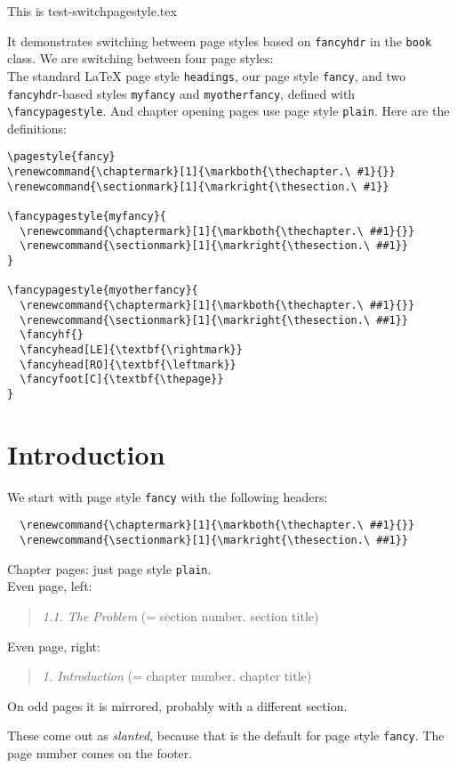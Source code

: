 \documentclass[openany]{book}
\renewcommand{\chaptermark}[1]{\markboth{\thechapter.\ #1}{}}
\renewcommand{\sectionmark}[1]{\markright{\thesection.\ #1}}
\renewcommand{\chaptermark}[1]{\markboth{\thechapter.\ ##1}{}}
\renewcommand{\sectionmark}[1]{\markright{\thesection.\ ##1}}
\renewcommand{\chaptermark}[1]{\markboth{\thechapter.\ ##1}{}}
\renewcommand{\sectionmark}[1]{\markright{\thesection.\ ##1}}
\begin{document}
\tableofcontents

\newpage
\thispagestyle{plain}

\noindent
\begin{boxedminipage}{\textwidth}
  This is test-switchpagestyle.tex

  It demonstrates switching between page styles based on
  \texttt{fancyhdr} in the \texttt{book} class. We are switching between
  four page styles:\\ The standard \LaTeX{} page style \texttt{headings},
  our page style \texttt{fancy}, and two \texttt{fancyhdr}-based styles
  \texttt{myfancy} and \texttt{myotherfancy}, defined with
  \verb|\fancypagestyle|. And chapter opening pages use page style \texttt{plain}.
  Here are the definitions:

\begin{verbatim}
\pagestyle{fancy}
\renewcommand{\chaptermark}[1]{\markboth{\thechapter.\ #1}{}}
\renewcommand{\sectionmark}[1]{\markright{\thesection.\ #1}}

\fancypagestyle{myfancy}{
  \renewcommand{\chaptermark}[1]{\markboth{\thechapter.\ ##1}{}}
  \renewcommand{\sectionmark}[1]{\markright{\thesection.\ ##1}}
}

\fancypagestyle{myotherfancy}{
  \renewcommand{\chaptermark}[1]{\markboth{\thechapter.\ ##1}{}}
  \renewcommand{\sectionmark}[1]{\markright{\thesection.\ ##1}}
  \fancyhf{}
  \fancyhead[LE]{\textbf{\rightmark}}
  \fancyhead[RO]{\textbf{\leftmark}}
  \fancyfoot[C]{\textbf{\thepage}}
}
\end{verbatim}
\end{boxedminipage}

\chapter{Introduction}

\noindent
\begin{boxedminipage}{\textwidth}
We start with page style \texttt{fancy} with the following headers:
\begin{verbatim}
  \renewcommand{\chaptermark}[1]{\markboth{\thechapter.\ ##1}{}}
  \renewcommand{\sectionmark}[1]{\markright{\thesection.\ ##1}}
\end{verbatim}
%
Chapter pages: just page style \texttt{plain}.
\\
Even page, left:
\begin{quote}
  \textsl{1.1. The Problem} (= section number. section title)
\end{quote}
Even page, right:
\begin{quote}
  \textsl{1. Introduction} (= chapter number. chapter title)
\end{quote}
On odd pages it is mirrored, probably with a different section.

These come out as \textsl{slanted}, because that is the default for page style \texttt{fancy}.
The page number comes on the footer.
\end{boxedminipage}
\bigskip
\end{document}
